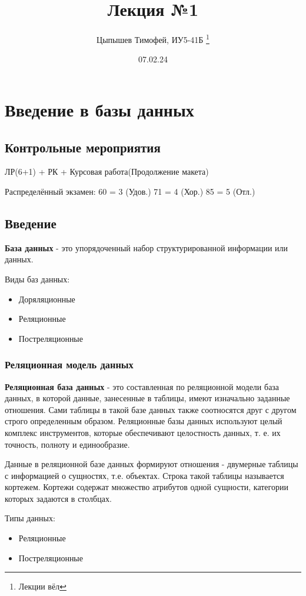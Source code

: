 \documentclass[12pt, a4paper]{report}
\title{Лекция №1}
\author{Цыпышев Тимофей, ИУ5-41Б \thanks{Лекции вёл }}
\date{07.02.24}
\begin{document}

\chapter{Введение в базы данных}

\section{Контрольные мероприятия}

ЛР(6+1) + РК + Курсовая работа(Продолжение макета)

Распределённый экзамен:
60 = 3 (Удов.)
71 = 4 (Хор.)
85 = 5 (Отл.)

\section{Введение}

\textbf{База данных}  - это упорядоченный набор структурированной информации или данных.

Виды баз данных:
\begin{itemize}
    \item Доряляционные
    \item Реляционные
    \item Постреляционные
\end{itemize}

\subsection{Реляционная модель данных}

\textbf{Реляционная база данных} - это составленная по реляционной модели база данных, в которой данные, занесенные в таблицы, имеют изначально заданные отношения. Сами таблицы в такой базе данных также соотносятся друг с другом строго определенным образом. Реляционные базы данных используют целый комплекс инструментов, которые обеспечивают целостность данных, т. е. их точность, полноту и единообразие.

Данные в реляционной базе данных формируют отношения - двумерные таблицы с информацией о сущностях, т.е. объектах. Строка такой таблицы называется кортежем. Кортежи содержат множество атрибутов одной сущности, категории которых задаются в столбцах.

Типы данных:
\begin{itemize}
    \item Реляционные
    \item Постреляционные
\end{itemize}
\end{document}
